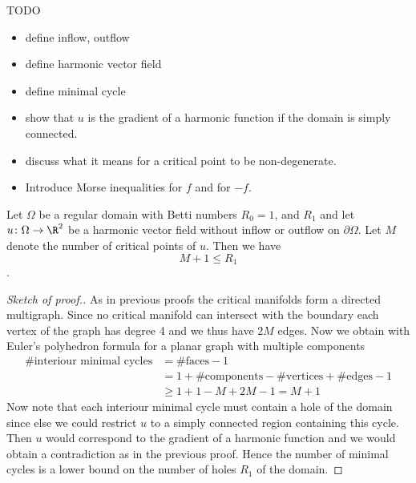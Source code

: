 TODO
\begin{itemize}
  \item define inflow, outflow
  \item define harmonic vector field
  \item define minimal cycle 
  \item show that $u$ is the gradient of a harmonic function if the domain is simply connected.
  \item discuss what it means for a critical point to be non-degenerate.
  \item Introduce Morse inequalities for $f$ and for $-f$.
\end{itemize}

\begin{proposition}
  Let $\Omega$ be a regular domain with Betti numbers $R_0=1$, and $R_1$ and let $u\colon\Omega\to\R^2$ be 
  a harmonic vector field without inflow or outflow on $\partial\Omega$. Let $M$ denote the number of critical points of $u$.
  Then we have $$M+1\leq R_1$$.
\end{proposition}
\begin{proof}[Sketch of proof.]
  As in previous proofs the critical manifolds form a directed multigraph. Since no critical manifold can intersect with the boundary each vertex
  of the graph has degree 4 and we thus have $2M$ edges. Now we obtain with Euler's polyhedron formula
  for a planar graph with multiple components
  \begin{align*}
    \text{\# interiour minimal cycles}
    &= \text{\#faces}-1 \\
    &= 1+\text{\#components}-\text{\#vertices}+\text{\#edges} -1 \\
    &\geq 1+1-M+2M -1 = M+1
  \end{align*}
  Now note that each interiour minimal cycle must contain a hole of the domain since else we could restrict $u$ to a simply
  connected region containing this cycle. Then $u$ would correspond to the gradient of 
  a harmonic function and we would obtain a contradiction as in the previous proof.
  Hence the number of minimal cycles is a lower bound on the number of holes $R_1$ of the domain.
\end{proof}

